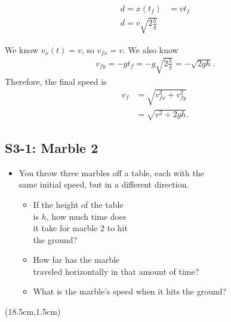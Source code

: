 \documentclass[]{article}
\begin{document}
\begin{TeacherMargin}
\begin{multicols}{2}
	\begin{align*}
		d = x(t_{f}) & = vt_{f} \\
		d = v\sqrt{2\frac{h}{g}}
	\end{align*}
\end{multicols}
\begin{multicols}{2}
\noindent We know $v_{x}(t) = v$, so $v_{fx} = v$. We also know
\begin{align*}
	v_{fy} = -gt_{f} = -g\sqrt{2\frac{h}{g}} = -\sqrt{2gh}.
\end{align*}
Therefore, the final speed is
\begin{align*}
	v_{f} & = \sqrt{v_{fx}^{2}+v_{fy}^{2}} \\
	& = \sqrt{v^{2}+2gh}.
\end{align*}
\end{multicols}
\end{TeacherMargin}
\begin{PresentSpace}
\vspace{-10pt}
\section*{S3-1: Marble 2}
\vspace{-10pt}
\begin{itemize}
	\item You throw three marbles off a table, each with the \\
	same initial speed, but in a different direction.
	\vspace{10pt}
	\begin{itemize}
		\item If the height of the table \\
		is $h$, how much time does \\
		it take for marble 2 to hit \\
		the ground?
		\item How far has the marble \\
		traveled horizontally in that amount of time?
		\item What is the marble's speed when it hits the ground?
	\end{itemize}
\end{itemize}
\end{PresentSpace}
\begin{textblock*}{10cm}(18.5cm,1.5cm)
	\Large
\end{textblock*}
\end{document}
